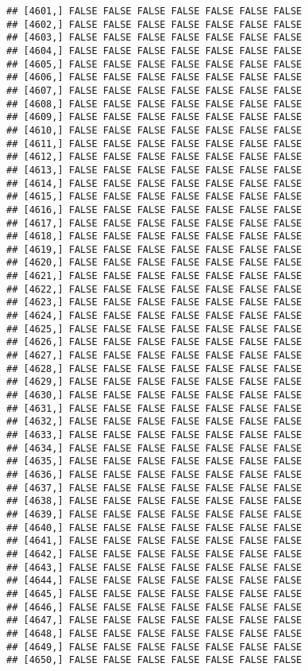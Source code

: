 \documentclass[
]{article}
\begin{document}
\begin{verbatim}
## [4601,] FALSE FALSE FALSE FALSE FALSE FALSE FALSE
## [4602,] FALSE FALSE FALSE FALSE FALSE FALSE FALSE
## [4603,] FALSE FALSE FALSE FALSE FALSE FALSE FALSE
## [4604,] FALSE FALSE FALSE FALSE FALSE FALSE FALSE
## [4605,] FALSE FALSE FALSE FALSE FALSE FALSE FALSE
## [4606,] FALSE FALSE FALSE FALSE FALSE FALSE FALSE
## [4607,] FALSE FALSE FALSE FALSE FALSE FALSE FALSE
## [4608,] FALSE FALSE FALSE FALSE FALSE FALSE FALSE
## [4609,] FALSE FALSE FALSE FALSE FALSE FALSE FALSE
## [4610,] FALSE FALSE FALSE FALSE FALSE FALSE FALSE
## [4611,] FALSE FALSE FALSE FALSE FALSE FALSE FALSE
## [4612,] FALSE FALSE FALSE FALSE FALSE FALSE FALSE
## [4613,] FALSE FALSE FALSE FALSE FALSE FALSE FALSE
## [4614,] FALSE FALSE FALSE FALSE FALSE FALSE FALSE
## [4615,] FALSE FALSE FALSE FALSE FALSE FALSE FALSE
## [4616,] FALSE FALSE FALSE FALSE FALSE FALSE FALSE
## [4617,] FALSE FALSE FALSE FALSE FALSE FALSE FALSE
## [4618,] FALSE FALSE FALSE FALSE FALSE FALSE FALSE
## [4619,] FALSE FALSE FALSE FALSE FALSE FALSE FALSE
## [4620,] FALSE FALSE FALSE FALSE FALSE FALSE FALSE
## [4621,] FALSE FALSE FALSE FALSE FALSE FALSE FALSE
## [4622,] FALSE FALSE FALSE FALSE FALSE FALSE FALSE
## [4623,] FALSE FALSE FALSE FALSE FALSE FALSE FALSE
## [4624,] FALSE FALSE FALSE FALSE FALSE FALSE FALSE
## [4625,] FALSE FALSE FALSE FALSE FALSE FALSE FALSE
## [4626,] FALSE FALSE FALSE FALSE FALSE FALSE FALSE
## [4627,] FALSE FALSE FALSE FALSE FALSE FALSE FALSE
## [4628,] FALSE FALSE FALSE FALSE FALSE FALSE FALSE
## [4629,] FALSE FALSE FALSE FALSE FALSE FALSE FALSE
## [4630,] FALSE FALSE FALSE FALSE FALSE FALSE FALSE
## [4631,] FALSE FALSE FALSE FALSE FALSE FALSE FALSE
## [4632,] FALSE FALSE FALSE FALSE FALSE FALSE FALSE
## [4633,] FALSE FALSE FALSE FALSE FALSE FALSE FALSE
## [4634,] FALSE FALSE FALSE FALSE FALSE FALSE FALSE
## [4635,] FALSE FALSE FALSE FALSE FALSE FALSE FALSE
## [4636,] FALSE FALSE FALSE FALSE FALSE FALSE FALSE
## [4637,] FALSE FALSE FALSE FALSE FALSE FALSE FALSE
## [4638,] FALSE FALSE FALSE FALSE FALSE FALSE FALSE
## [4639,] FALSE FALSE FALSE FALSE FALSE FALSE FALSE
## [4640,] FALSE FALSE FALSE FALSE FALSE FALSE FALSE
## [4641,] FALSE FALSE FALSE FALSE FALSE FALSE FALSE
## [4642,] FALSE FALSE FALSE FALSE FALSE FALSE FALSE
## [4643,] FALSE FALSE FALSE FALSE FALSE FALSE FALSE
## [4644,] FALSE FALSE FALSE FALSE FALSE FALSE FALSE
## [4645,] FALSE FALSE FALSE FALSE FALSE FALSE FALSE
## [4646,] FALSE FALSE FALSE FALSE FALSE FALSE FALSE
## [4647,] FALSE FALSE FALSE FALSE FALSE FALSE FALSE
## [4648,] FALSE FALSE FALSE FALSE FALSE FALSE FALSE
## [4649,] FALSE FALSE FALSE FALSE FALSE FALSE FALSE
## [4650,] FALSE FALSE FALSE FALSE FALSE FALSE FALSE

\end{verbatim}
\end{document}
